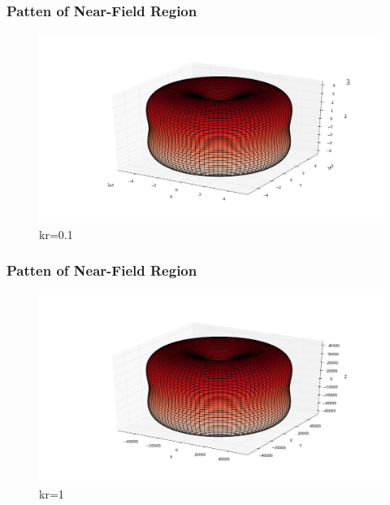 \documentclass[compress=true]{beamer}
\begin{document}
\begin{frame}
  \frametitle{Patten of Near-Field Region}
  \begin{figure}
    \includegraphics[height=0.68\textheight]{near_kr_0_1_1.png}
    \caption*{\tiny{kr=0.1}}
  \end{figure}
\end{frame}
\begin{frame}
  \frametitle{Patten of Near-Field Region}
  \begin{figure}
    \includegraphics[height=0.68\textheight]{near_kr_1_1.png}
    \caption*{\tiny{kr=1}}
  \end{figure}
\end{frame}
\end{document}
